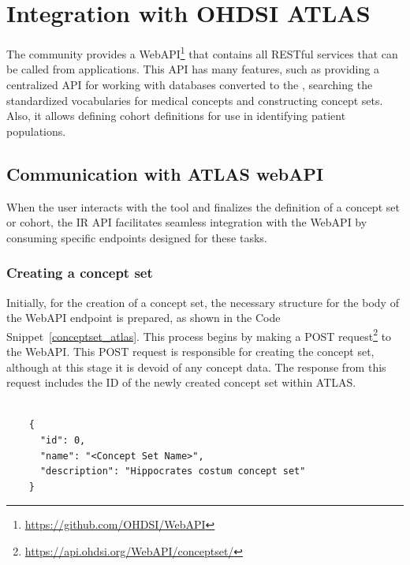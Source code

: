 \section{Integration with OHDSI ATLAS}

The {\ohdsi} community provides a WebAPI\footnote{\url{https://github.com/OHDSI/WebAPI}} that contains all {\ohdsi} RESTful services that can be called from {\ohdsi} applications. This API has many features, such as providing a centralized API for working with databases converted to the {\omop}, searching the {\omop} standardized vocabularies for medical concepts and constructing concept sets. Also, it allows defining cohort definitions for use in identifying patient populations.


\subsection{Communication with ATLAS webAPI}

When the user interacts with the tool and finalizes the definition of a concept set or cohort, the IR API facilitates seamless integration with the {\ohdsi} WebAPI by consuming specific endpoints designed for these tasks.

\subsubsection{Creating a concept set}

Initially, for the creation of a concept set, the necessary structure for the body of the {\ohdsi} WebAPI endpoint is prepared, as shown in the Code Snippet~\ref{conceptset_atlas}. This process begins by making a POST request\footnote{\url{https://api.ohdsi.org/WebAPI/conceptset/}} to the {\ohdsi} WebAPI. This POST request is responsible for creating the concept set, although at this stage it is devoid of any concept data. The response from this request includes the ID of the newly created concept set within ATLAS.

\begin{listing}[H]
  \begin{verbatim}
      
    { 
      "id": 0, 
      "name": "<Concept Set Name>", 
      "description": "Hippocrates costum concept set"
    }

  \end{verbatim}
  \caption[The body to create the concept set in ATLAS]{The body to create the concept set in ATLAS.}
  \label{conceptset_atlas}
\end{listing}


